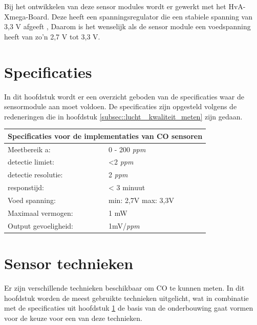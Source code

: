 \documentclass[a4paper, 11pt]{article} %
\begin{document}
	Bij het ontwikkelen van deze sensor modules wordt er gewerkt met het HvA-Xmega-Board. Deze heeft een spanningsregulator die een stabiele spanning van 3,3 V afgeeft \cite{xmega}, Daarom is het wenselijk als de sensor module een voedspanning heeft van zo'n 2,7 V tot 3,3 V.
	
	\section{Specificaties} \label{sec::specificaties}
	In dit hoofdstuk wordt er een overzicht geboden van de specificaties waar de sensormodule aan moet voldoen. De specificaties zijn opgesteld volgens de redeneringen die in hoofdstuk \ref{subsec::lucht _kwaliteit_meten} zijn gedaan.
	\begin{center}
		\begin{tabular}{ | m{5cm} | m{5cm}| } 
			\hline
			\multicolumn{2}{|c|}{Specificaties voor de implementaties van CO sensoren} \\
			\hline
			Meetbereik a: & 0 - 200 \textit{ppm} \\
			\hline
			detectie limiet:  & <2 \textit{ppm}
			\\ 
			\hline
			detectie resolutie: & 2 \textit{ppm} 
			\\ 
			\hline
			responstijd: & < 3 minuut
			\\ 
			\hline
			Voed spanning: & min: 2,7V max: 3,3V
			\\ 
			\hline
			Maximaal vermogen: & 1 mW
			\\
			\hline
			Output gevoeligheid: & 1mV/\textit{ppm}
			\\
			\hline
		\end{tabular}
	\end{center}
	
	\section{Sensor technieken} \label{sec::sensor_technieken}
	Er zijn verschillende technieken beschikbaar om CO te kunnen meten. In dit hoofdstuk worden de meest gebruikte technieken uitgelicht, wat in combinatie met de specificaties uit hoofdstuk \ref{sec::specificaties} de basis van de onderbouwing gaat vormen voor de keuze voor een van deze technieken.
	
\end{document}
